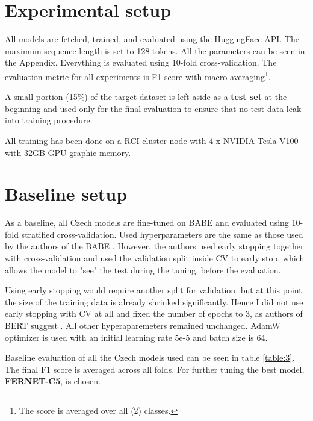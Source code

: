 \section{Experimental setup}
All models are fetched, trained, and evaluated using the HuggingFace API. The maximum sequence length is set to 128 tokens. All the parameters can be seen in the Appendix.
Everything is evaluated using 10-fold cross-validation. The evaluation metric for all experiments is F1 score with macro averaging\footnote{The score is averaged over all (2) classes.}. 

A small portion (15\%) of the target dataset is left aside as a \textbf{test set} at the beginning and used only for the final evaluation to ensure that no test data leak into training procedure.

All training has been done on a RCI cluster node with 4 x NVIDIA Tesla V100 with 32GB GPU graphic memory.





 \section{Baseline setup}
 As a baseline, all Czech models are fine-tuned on BABE and evaluated using 10-fold stratified cross-validation. Used hyperparameters are the same as those used by the authors of the BABE \cite{Spinde2021MBIC}. However, the authors used early stopping together with cross-validation and used the validation split inside CV to early stop, which allows the model to "see" the test during the tuning, before the evaluation. 
 
 Using early stopping would require another split for validation, but at this point the size of the training data is already shrinked significantly. Hence I did not use early stopping with CV at all and fixed the number of epochs to 3, as authors of BERT suggest \cite{devlin2019bert} . 
 All other hyperaparemeters remained unchanged. AdamW optimizer is used with an initial learning rate 5e-5 and batch size is 64.
 
 Baseline evaluation of all the Czech models used can be seen in table \ref{table:3}. The final F1 score is averaged across all folds. For further tuning the best model, \textbf{FERNET-C5}, is chosen.
 

 
 

 
 
 
 
